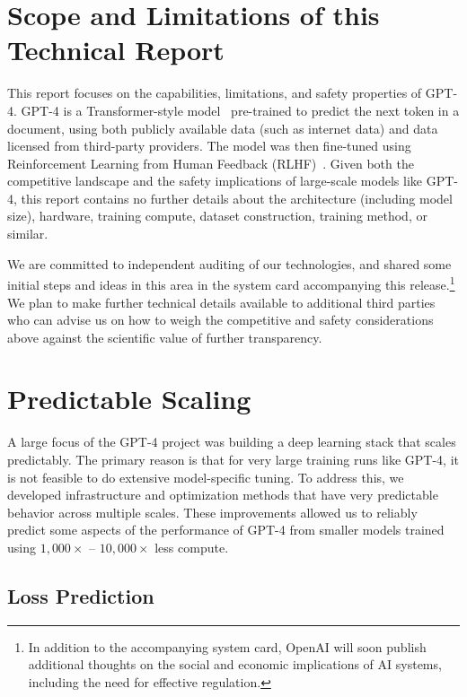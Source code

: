 \documentclass{article}
\begin{document}
\section{Scope and Limitations of this Technical Report}

This report focuses on the capabilities, limitations, and safety properties of GPT-4. GPT-4 is a Transformer-style model~\cite{vaswani2017attention} pre-trained to predict the next token in a document, using both publicly available data (such as internet data) and data licensed from third-party providers. The model was then fine-tuned using Reinforcement Learning from Human Feedback (RLHF)~\citep{christiano2017deep}. Given both the competitive landscape and the safety implications of large-scale models like GPT-4, this report contains no further details about the architecture (including model size), hardware, training compute, dataset construction, training method, or similar.


We are committed to independent auditing of our technologies, and shared some initial steps and ideas in this area in the system card accompanying this release.\footnote{In addition to the accompanying system card, OpenAI will soon publish additional thoughts on the social and economic implications of AI systems, including the need for effective regulation.} We plan to make further technical details available to additional third parties who can advise us on how to weigh the competitive and safety considerations above against the scientific value of further transparency.%








\section{Predictable Scaling}

A large focus of the GPT-4 project was building a deep learning stack that scales predictably. The primary reason is that for very large training runs like GPT-4, it is not feasible to do extensive model-specific tuning. To address this, we developed infrastructure and optimization methods that have very predictable behavior across multiple scales. These improvements allowed us to reliably predict some aspects of the performance of GPT-4 from smaller models trained using $1,000\times$ -- $10,000\times$ less compute.

\subsection{Loss Prediction}
\end{document}
